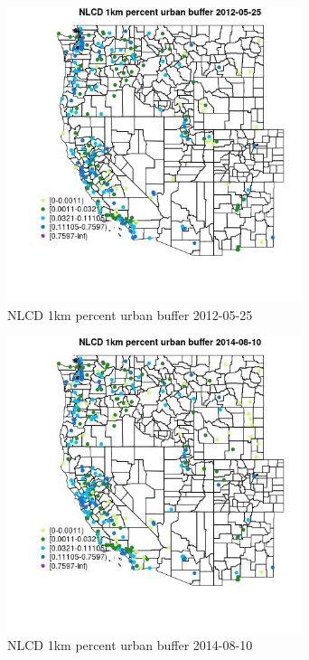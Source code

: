 \begin{figure} 
\centering  
\includegraphics[width=0.77\textwidth]{Code_Outputs/Report_ML_input_PM25_Step4_part_e_de_duplicated_aves_compiled_2019-05-18wNAs_MapObsNLCD_1km_percent_urban_buffer2012-05-25.jpg} 
\caption{\label{fig:Report_ML_input_PM25_Step4_part_e_de_duplicated_aves_compiled_2019-05-18wNAsMapObsNLCD_1km_percent_urban_buffer2012-05-25}NLCD 1km percent urban buffer 2012-05-25} 
\end{figure} 
 

\begin{figure} 
\centering  
\includegraphics[width=0.77\textwidth]{Code_Outputs/Report_ML_input_PM25_Step4_part_e_de_duplicated_aves_compiled_2019-05-18wNAs_MapObsNLCD_1km_percent_urban_buffer2014-08-10.jpg} 
\caption{\label{fig:Report_ML_input_PM25_Step4_part_e_de_duplicated_aves_compiled_2019-05-18wNAsMapObsNLCD_1km_percent_urban_buffer2014-08-10}NLCD 1km percent urban buffer 2014-08-10} 
\end{figure} 
 

